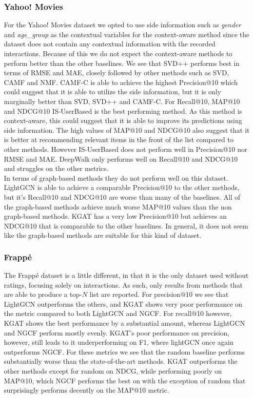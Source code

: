 \subsubsection{Yahoo! Movies}
For the Yahoo! Movies dataset we opted to use side information such as \textit{gender} and \textit{age_group} as the contextual variables for the context-aware method since the dataset does not contain any contextual information with the recorded interactions.
Because of this we do not expect the context-aware methods to perform better than the other baselines.
We see that SVD++ performs best in terms of RMSE and MAE, closely followed by other methods such as SVD, CAMF and NMF.
CAMF-C is able to achieve the highest Precision@10 which could suggest that it is able to utilize the side information, but it is only marginally better than SVD, SVD++ and CAMF-C.
For Recall@10, MAP@10 and NDCG@10 IS-UserBased is the best performing method.
As this method is context-aware, this could suggest that it is able to improve its predictions using side information.
The high values of MAP@10 and NDCG@10 also suggest that it is better at recommending relevant items in the front of the list compared to other methods.
However IS-UserBased does not perform well in Precision@10 nor RMSE and MAE.
DeepWalk only performs well on Recall@10 and NDCG@10 and struggles on the other metrics.
\\
In terms of graph-based methods they do not perform well on this dataset.
LightGCN is able to achieve a comparable Precision@10 to the other methods, but it's Recall@10 and NDCG@10 are worse than many of the baselines.
All of the graph-based methods achieve much worse MAP@10 values than the non graph-based methods.
KGAT has a very low Precision@10 but achieves an NDCG@10 that is comparable to the other baselines.
In general, it does not seem like the graph-based methods are suitable for this kind of dataset.

\subsubsection{Frappé}
The Frappé dataset is a little different, in that it is the only dataset used without ratings, focusing solely on interactions.
As such, only results from methods that are able to produce a top-$N$ list are reported.
For precision@10 we see that LightGCN outperforms the others, and KGAT shows very poor performance on the metric compared to both LightGCN and NGCF.
For recall@10 however, KGAT shows the best performance by a substantial amount, whereas LightGCN and NGCF perform mostly evenly.
KGAT's poor performance on precision, however, still leads to it underperforming on F1, where lightGCN once again outperforms NGCF.
For these metrics we see that the random baseline performs substantially worse than the state-of-the-art methods.
KGAT outperforms the other methods except for random on NDCG, while performing poorly on MAP@10, which NGCF performs the best on with the exception of random that surprisingly performs decently on the MAP@10 metric.